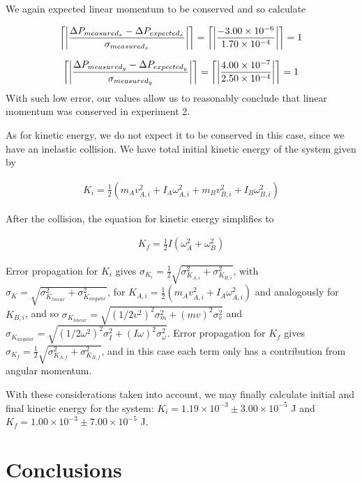\documentclass[11pt]{article}
\DeclarePairedDelimiter{\ceil}{\lceil}{\rceil}
\begin{document}
We again expected linear momentum to be conserved and so calculate

\begin{align}
\ceil*{\left\vert\frac{\Delta P_{measured_x}-\Delta P_{expected_x}}{\sigma_{measured_x}}\right\vert} = \ceil*{\left\vert\frac{-3.00\times10^{-6}}{1.70\times 10^{-4}}\right\vert} = 1
\label{errPx2}
\end{align}

\begin{align}
\ceil*{\left\vert\frac{\Delta P_{measured_y}-\Delta P_{expected_y}}{\sigma_{measured_y}}\right\vert} = \ceil*{\left\vert\frac{4.00\times10^{-7}}{2.50\times10^{-4}}\right\vert} = 1
\label{errPy2}
\end{align}
With such low error, our values allow us to reasonably conclude that linear momentum was conserved in experiment 2.

As for kinetic energy, we do not expect it to be conserved in this case, since we have an inelastic collision. We have total initial kinetic energy of the system given by 

\begin{align}
K_i = \frac{1}{2}(m_A v_{A,i}^2 + I_A \omega_{A,i}^2 + m_B v_{B,i}^2 +I_B \omega_{B,i}^2)
\end{align}

After the collision, the equation for kinetic energy simplifies to 

\begin{align}
K_f =\frac{1}{2}I(\omega_A^2+\omega_B^2)
\end{align}

Error propagation for $K_i$ gives $\sigma_{K_i} = \frac{1}{2}\sqrt{\sigma_{K_{A,i}}^2+\sigma_{K_{B,i}}^2}$, with $\sigma_K = \sqrt{\sigma_{K_{linear}}^2+\sigma_{K_{angular}}^2}$, for $K_{A,i}=\frac{1}{2}(m_A v_{A,i}^2+I_A \omega_{A,i}^2)$ and analogously for $K_{B,i}$, and so $\sigma_{K_{linear}}=\sqrt{(1/2v^2)^2\sigma_m^2+(mv)^2\sigma_v^2}$ and $\sigma_{K_{angular}}=\sqrt{(1/2\omega^2)^2\sigma_I^2+(I\omega)^2\sigma_{\omega}^2}$. Error propagation for $K_f$ gives $\sigma_{K_f}=\frac{1}{2}\sqrt{\sigma_{K_{A,f}}^2+\sigma_{K_{B,f}}^2}$, and in this case each term only has a contribution from angular momentum.

With these considerations taken into account, we may finally calculate initial and final kinetic energy for the system: $K_i = 1.19\times10^{-3} \pm3.00\times10^{-5}$ J and $K_f = 1.00\times10^{-3} \pm7.00\times10^{-5}$ J. 


\section{Conclusions}
\end{document}
